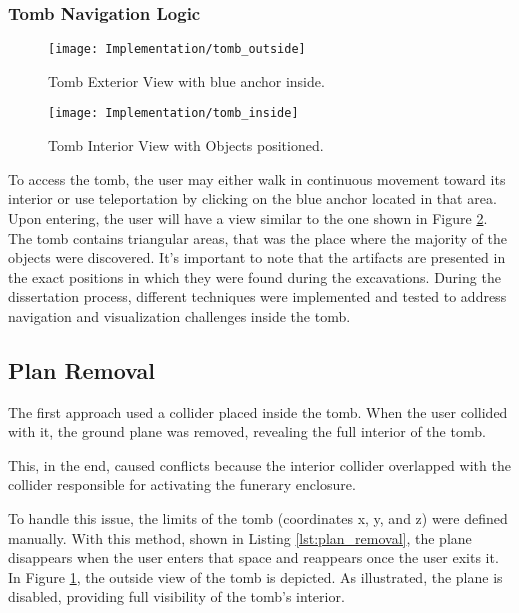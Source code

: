 \subsubsection{Tomb Navigation Logic}
\label{sec:tomb_logic}

 \begin{figure}[h!]
    \centering
    \texttt{[image: Implementation/tomb\_outside]}
    \caption{Tomb Exterior View with blue anchor inside.}
    \label{fig:tomb_outside}    
\end{figure}

 \begin{figure}[h!]
    \centering
    \texttt{[image: Implementation/tomb\_inside]}
    \caption{Tomb Interior View with Objects positioned.}
    \label{fig:tomb_inside}    
\end{figure}

To access the tomb, the user may either walk in continuous movement toward its interior or use teleportation by clicking on the blue anchor located in that area.
Upon entering, the user will have a view similar to the one shown in Figure \ref{fig:tomb_inside}.
The tomb contains triangular areas, that was the place where the majority of the objects were discovered. 
It's important to note that the artifacts are presented in the exact positions in which they were found during the excavations.
During the dissertation process, different techniques were implemented and tested to address navigation and visualization challenges inside the tomb.

\subsection*{Plan Removal}

The first approach used a collider placed inside the tomb. When the user collided with it, the ground plane was removed, revealing the full interior of the tomb.

This, in the end, caused conflicts because the interior collider overlapped with the collider responsible for activating the funerary enclosure.

To handle this issue, the limits of the tomb (coordinates x, y, and z) were defined manually. With this method, shown in Listing \ref{lst:plan_removal}, the plane disappears when the user enters that space and reappears once the user exits it.
In Figure \ref{fig:tomb_outside}, the outside view of the tomb is depicted. As illustrated, the plane is disabled, providing full visibility of the tomb’s interior.


